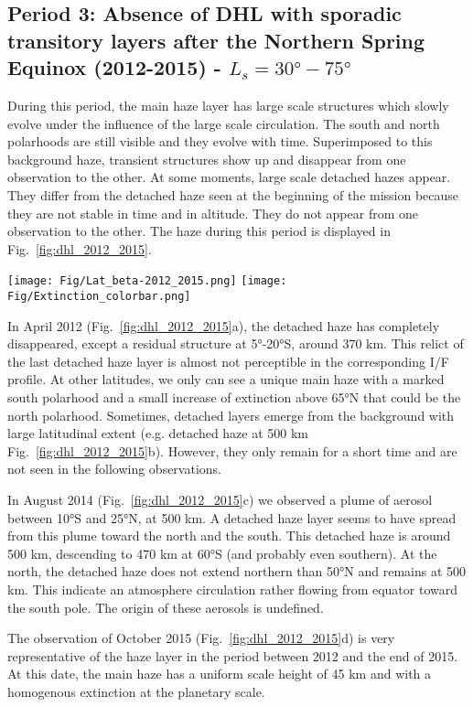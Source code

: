 \subsection{Period 3: Absence of DHL with sporadic transitory layers after the Northern Spring Equinox (2012-2015) - $L_s=\ang{30}-\ang{75}$}

During this period, the main haze layer has large scale structures which slowly evolve under the influence of the
large scale circulation. The south and north polarhoods are still visible and they evolve
with time. Superimposed to this background haze, transient structures show up and disappear from one observation
to the other. At some moments, large scale detached hazes appear. They differ from the detached haze seen at the
beginning of the mission because they are not stable in time and in altitude. They do not appear from one
observation to the other. The haze during this period is displayed in Fig.~\ref{fig:dhl_2012_2015}.

\begin{figure*}[!ht]
    \centering
    \texttt{[image: Fig/Lat\_beta-2012\_2015.png]}
    \texttt{[image: Fig/Extinction\_colorbar.png]}\vspace{-.3cm}
    \caption{Same as the figures~\ref{fig:dhl_2004_2008} and~\ref{fig:dhl_2008_2012}
    for 4 images taken between 2012 and 2015 ($L_s=\ang{30}-\ang{75}$) showing sporadic
    transitory layers and the absence of consistent DHL.
    The color extent is the same and the altitude ranges down to 350 km.}
    \label{fig:dhl_2012_2015}
\end{figure*}

In April 2012 (Fig.~\ref{fig:dhl_2012_2015}a), the detached haze has completely disappeared, except a residual
structure at \ang{5}-\ang{20}S, around 370 km.
This relict of the last detached haze layer is almost not perceptible in the corresponding I/F profile. At other
latitudes, we only can see a unique main haze with a marked south polarhood and a small increase of extinction above
\ang{65}N that could be the north polarhood. Sometimes, detached layers emerge from the background with large latitudinal
extent (e.g. detached haze at 500 km Fig.~\ref{fig:dhl_2012_2015}b). However, they only remain for a short time
and are not seen in the following observations.

In August 2014 (Fig.~\ref{fig:dhl_2012_2015}c) we observed a plume of aerosol between \ang{10}S and \ang{25}N,
at 500 km. A detached haze layer seems to have spread from this plume toward the north and the south. This
detached haze is around 500 km, descending to 470 km at \ang{60}S (and probably even southern). At the
north, the detached haze does not extend northern than \ang{50}N and remains at 500 km. This indicate an
atmosphere circulation rather flowing from equator toward the south pole. The origin of these aerosols is undefined.

The observation of October 2015 (Fig.~\ref{fig:dhl_2012_2015}d) is very representative of the haze layer in
the period between 2012 and the end of 2015. At this date, the main haze has a uniform scale height of 45 km and
with a homogenous extinction at the planetary scale.
